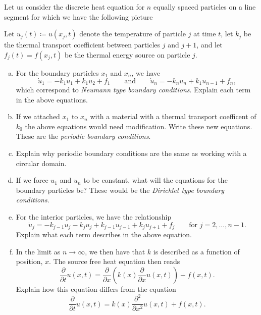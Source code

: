 \documentclass[12pt]{article} %
\begin{document}
\begin{problem}
Let us consider the discrete heat equation for $n$ equally spaced particles on a line segment for which we have the following picture
\begin{figure}[H]
	\centering
	\resizebox{.9\columnwidth}{!}{}
\end{figure}
Let $u_j(t) \coloneqq u(x_j,t)$ denote the temperature of particle $j$ at time $t$, let $k_j$ be the thermal transport coefficient between particles $j$ and $j+1$, and let $f_j(t)=f(x_j,t)$ be the thermal energy source on particle $j$.
\begin{enumerate}[(a)]
    \item For the boundary particles $x_1$ and $x_n$, we have
    \[
    \dot{u}_1 = -k_1 u_1 + k_1 u_{2} + f_1 \qquad \textrm{and} \qquad \dot{u}_n = -k_n u_{n} + k_1 u_{n-1} +f_n,
    \]
    which correspond to \emph{Neumann type boundary conditions}. Explain each term in the above equations.
    \item If we attached $x_1$ to $x_n$ with a material with a thermal transport coefficent of $k_0$ the above equations would need modification. Write these new equations. These are the \emph{periodic boundary conditions}. 
    \item Explain why periodic boundary conditions are the same as working with a circular domain.
    \item If we force $u_1$ and $u_n$ to be constant, what will the equations for the boundary particles be? These would be the \emph{Dirichlet type boundary conditions}.
    \item For the interior particles, we have the relationship
    \[
    \dot{u}_j = -k_{j-1}u_j - k_{j} u_j + k_{j-1}u_{j-1} + k_{j} u_{j+1} +f_j \qquad \textrm{for $j=2,\dots,n-1$}.
    \]
    Explain what each term describes in the above equation.
    \item In the limit as $n\to \infty$, we then have that $k$ is described as a function of position, $x$. The source free heat equation then reads
    \[
    \frac{\partial}{\partial t}u(x,t) = \frac{\partial}{\partial x} \left( k(x)\frac{\partial}{\partial x} u(x,t) \right) + f(x,t).
    \]
    Explain how this equation differs from the equation
    \[
    \frac{\partial}{\partial t}u(x,t) = k(x) \frac{\partial^2}{\partial x^2} u(x,t)+f(x,t).
    \]
\end{enumerate}
\end{problem}
\end{document}
